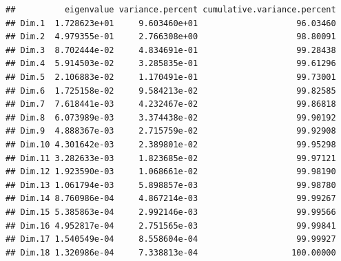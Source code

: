 \documentclass[../thesis.tex]{subfiles}
\begin{document}
\newpage
\begin{Shaded}
	\begin{Highlighting}[]
\SpecialCharTok{::}
	\end{Highlighting}
\end{Shaded}
\begin{verbatim}
##          eigenvalue variance.percent cumulative.variance.percent
## Dim.1  1.728623e+01     9.603460e+01                    96.03460
## Dim.2  4.979355e-01     2.766308e+00                    98.80091
## Dim.3  8.702444e-02     4.834691e-01                    99.28438
## Dim.4  5.914503e-02     3.285835e-01                    99.61296
## Dim.5  2.106883e-02     1.170491e-01                    99.73001
## Dim.6  1.725158e-02     9.584213e-02                    99.82585
## Dim.7  7.618441e-03     4.232467e-02                    99.86818
## Dim.8  6.073989e-03     3.374438e-02                    99.90192
## Dim.9  4.888367e-03     2.715759e-02                    99.92908
## Dim.10 4.301642e-03     2.389801e-02                    99.95298
## Dim.11 3.282633e-03     1.823685e-02                    99.97121
## Dim.12 1.923590e-03     1.068661e-02                    99.98190
## Dim.13 1.061794e-03     5.898857e-03                    99.98780
## Dim.14 8.760986e-04     4.867214e-03                    99.99267
## Dim.15 5.385863e-04     2.992146e-03                    99.99566
## Dim.16 4.952817e-04     2.751565e-03                    99.99841
## Dim.17 1.540549e-04     8.558604e-04                    99.99927
## Dim.18 1.320986e-04     7.338813e-04                   100.00000
\end{verbatim}




\begin{Shaded}
	\begin{Highlighting}[]
	\end{Highlighting}
\end{Shaded}
\end{document}
